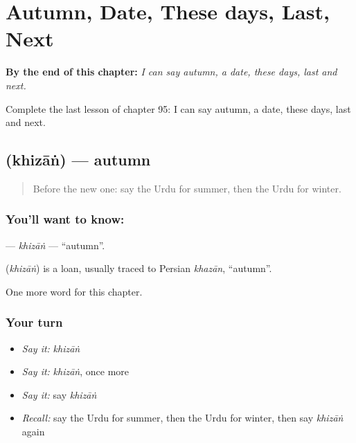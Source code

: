 
\chapter{Autumn, Date, These days, Last, Next}
\label{ch:ur-autumn-date-these-days-last-next}

\begin{chapteropening}
\textbf{By the end of this chapter:} \emph{I can say autumn, a date, these days, last and next.}

Complete the last lesson of chapter 95: I can say autumn, a date, these days, last and next.
\end{chapteropening}

\section[\texorpdfstring{\ur{خزاں} (khizāṅ)}{خزاں (khizāṅ)}]{ (khizāṅ) — autumn}

\label{lesson:UR-C95-khizan}



\begin{quote}
Before the new one: say the Urdu for summer, then the Urdu for winter.
\end{quote}

\subsection*{You'll want to know: }
\textbf{} — \emph{khizāṅ} — \textquotedblleft{}autumn\textquotedblright{}.

\begin{cousinweb}
\textbf{} (\emph{khizāṅ}) is a loan, usually traced to Persian \emph{khazān}, \textquotedblleft{}autumn\textquotedblright{}.
\end{cousinweb}

\begin{grammarlens}[title={What you've built}]
One more word for this chapter.
\end{grammarlens}

\subsection*{Your turn}
\begin{itemize}
\raggedright
  \item \emph{Say it:} \emph{khizāṅ}
  \item \emph{Say it:} \emph{khizāṅ}, once more
  \item \emph{Say it:} say \emph{khizāṅ}
  \item \emph{Recall:} say the Urdu for summer, then the Urdu for winter, then say \emph{khizāṅ} again
\end{itemize}

